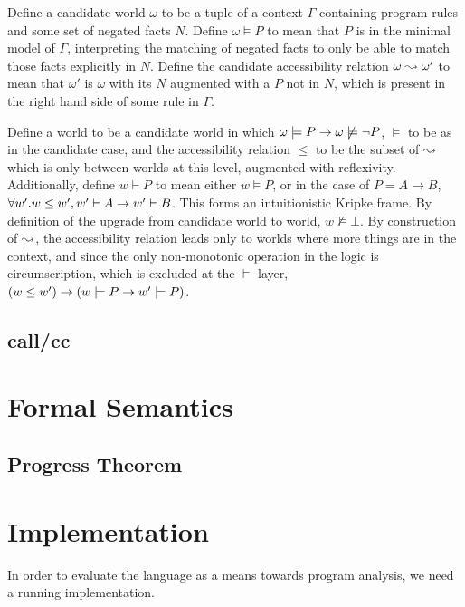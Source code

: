 Define a candidate world $\omega$ to be a tuple of a context $\Gamma$ containing program rules and some set of negated facts $N$.
Define $\omega \models P$ to mean that $P$ is in the minimal model of $\Gamma$, interpreting the matching of negated facts to only be able to match those facts explicitly in $N$.
Define the candidate accessibility relation $\omega \leadsto \omega'$ to mean that $\omega'$ is $\omega$ with its $N$ augmented with a $P$ not in $N$, which is present in the right hand side of some rule in $\Gamma$.

Define a world to be a candidate world in which $\omega \models P \rightarrow \omega \not \models \neg P$, $\models$ to be as in the candidate case, and the accessibility relation $\leq$ to be the subset of $\leadsto$ which is only between worlds at this level, augmented with reflexivity.
Additionally, define $w \vdash P$ to mean either $w \models P$, or in the case of $P = A \rightarrow B$, $\forall w'. w \leq w', w' \vdash A \rightarrow w' \vdash B$.
This forms an intuitionistic Kripke frame.
By definition of the upgrade from candidate world to world, $w \not \models \bot$.
By construction of $\leadsto$, the accessibility relation leads only to worlds where more things are in the context, and since the only non-monotonic operation in the logic is circumscription, which is excluded at the $\models$ layer, $(w \leq w') \rightarrow (w \models P \rightarrow w' \models P)$.

\subsection{call/cc}
\section{Formal Semantics}
\subsection{Progress Theorem}
\section{Implementation}
In order to evaluate the language as a means towards program analysis, we need a running implementation.

